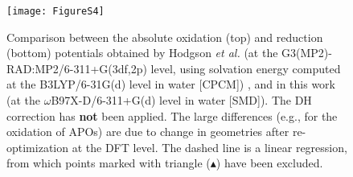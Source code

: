 \documentclass[11pt,a4paper]{article}
\begin{document}
\begin{figure}[!h]
	\centering
	\texttt{[image: FigureS4]}
	\caption{Comparison between the absolute oxidation (top) and reduction (bottom) potentials obtained by Hodgson \emph{et al.} (at the G3(MP2)-RAD:MP2/6-311+G(3df,2p) level, using solvation energy computed at the B3LYP/6-31G(d) level in water [CPCM]) \cite{hodgsonOneElectronOxidationReduction2007}, and in this work (at the $\omega$B97X-D/6-311+G(d) level in water [SMD]). The DH correction has \textbf{not} been applied. The large differences (e.g., for the oxidation of APOs) are due to change in geometries after re-optimization at the DFT level. The dashed line is a linear regression, from which points marked with triangle ($\blacktriangle$) have been excluded.}
\end{figure}

\clearpage
\end{document}
